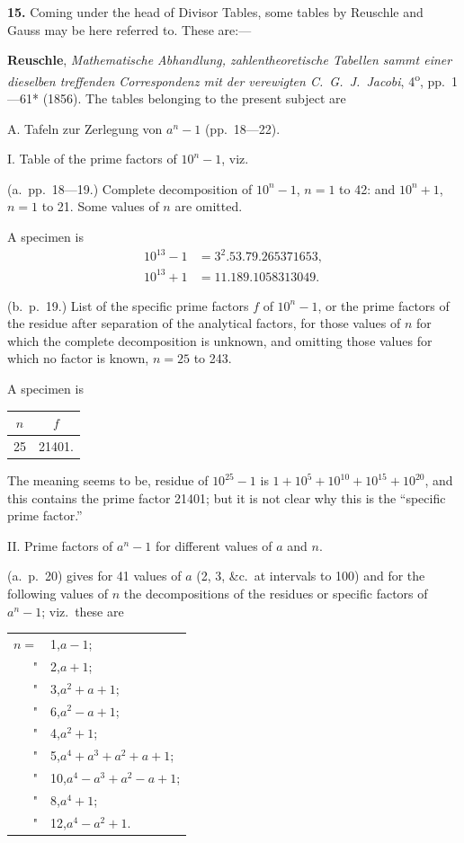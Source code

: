 \documentclass[11pt,a4paper]{book}
\begin{document}
\textbf{15.} Coming under the head of Divisor Tables, some tables by Reuschle and Gauss may be here referred to. These are:---

\quad\textbf{Reuschle}, \textit{Mathematische Abhandlung, zahlentheoretische Tabellen sammt einer dieselben treffenden Correspondenz mit der verewigten C.\ G.\ J.\ Jacobi}, 4\textsuperscript{o}, pp.\ 1---61* (1856). The tables belonging to the present subject are

A. Tafeln zur Zerlegung von $a^{n}-1$ (pp.\ 18---22).

I. Table of the prime factors of $10^{n}-1$, viz.

(a.\ pp.\ 18---19.) Complete decomposition of $10^{n}-1$, $n=1$ to 42: and $10^{n}+1$, $n=1$ to 21. Some values of $n$ are omitted.

A specimen is
\begin{align*}
10^{13}-1 &= 3^{2}.53.79.265371653,\\
10^{13}+1 &= 11.189.1058313049.
\end{align*}

(b.\ p.\ 19.) List of the specific prime factors $f$ of $10^{n}-1$, or the prime factors of the residue after separation of the analytical factors, for those values of $n$ for which the complete decomposition is unknown, and omitting those values for which no factor is known, $n = 25$ to 243.

A specimen is
\begin{center}
\begin{tabular}{c|c}
$n$ & $f$ \\
\hline
25 & 21401.
\end{tabular}
\end{center}

The meaning seems to be, residue of $10^{25}-1$ is $1+10^{5}+10^{10}+10^{15}+10^{20}$, and this contains the prime factor 21401; but it is not clear why this is the ``specific prime factor.''

II. Prime factors of $a^{n}-1$ for different values of $a$ and $n$.

(a.\ p.\ 20) gives for 41 values of $a$ (2, 3, \&c.\ at intervals to 100) and for the following values of $n$ the decompositions of the residues or specific factors of $a^{n}-1$; viz.\ these are
\begin{center}
\begin{tabular}{r@{\quad}l}
$n=$ & 1,\quad $a-1$; \\
" & 2,\quad $a+1$; \\
" & 3,\quad $a^{2}+a+1$; \\
" & 6,\quad $a^{2}-a+1$; \\
" & 4,\quad $a^{2}+1$; \\
" & 5,\quad $a^{4}+a^{3}+a^{2}+a+1$; \\
" & 10,\quad $a^{4}-a^{3}+a^{2}-a+1$; \\
" & 8,\quad $a^{4}+1$; \\
" & 12,\quad $a^{4}-a^{2}+1$. \\
\end{tabular}
\end{center}
\end{document}
